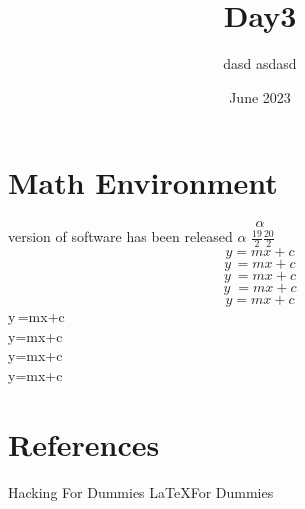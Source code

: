 \documentclass{report}
\title{Day3}
\author{dasd asdasd}
\date{June 2023}
\begin{document}
\maketitle

\section{Math Environment}
$$\alpha$$ version of software has been released
$\alpha$
$
\frac{19}{2}
\frac{20}{2}
$
\begin{equation}
    y=mx+c
\end{equation}
    $$y\,=mx+c$$
    $$y\:=mx+c$$
    $$y\;=mx+c$$
    $$y\!=mx+c$$
    y\,=mx+c\\
    y\:=mx+c\\
    y\;=mx+c\\
    y\!=mx+c

\section{References}
\lipsum[1] \cite{100}

\begin{thebibliography}{99}
 Hacking For Dummies
 \LaTeX For Dummies
\end{thebibliography}
\end{document}

